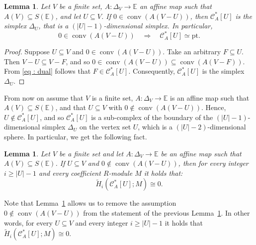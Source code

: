 \documentclass[a4paper,11pt,reqno, english]{amsart}
\newtheorem{lemma}[theorem]{Lemma}
\theoremstyle{definition}
\theoremstyle{remark}
\newcommand\CC{\mathscr C}
\newcommand\E{\mathbb{E}}
\newcommand\pt{\mathrm{pt}}
\DeclareMathOperator{\conv}{\mathrm{conv}}
\begin{document}
\medskip
\begin{lemma}
	\label{lem : topology of induced sub-complexes 01 }
	Let $V$ be a finite set, $A\colon \Delta_V\longrightarrow\E$ an affine map such that $A(V)\subseteq S(\E)$, and let $U\subseteq V$.
	If $0\in\conv( A(V-U))$, then $\CC_A^*[U]$ is the simplex $\Delta_U$, that is a $(|U|-1)$-dimensional simplex.
	In particular,
	\[
		0\in\conv( A(V-U)) \quad \Longrightarrow \quad\CC_A^*[U]\simeq\pt.
	\]
\end{lemma}
\begin{proof}
	Suppose $U\subseteq V$ and $0\in \conv(A(V-U))$.
	Take an arbitrary $F\subseteq U$.
	Then $V-U\subseteq V-F$, and so $0\in \conv (A(V-U))\subseteq\conv (A (V-F))$.
	From \eqref{eq : dual} follows that $F\in\CC_A^*[U]$.
	Consequently, $\CC_A^*[U]$ is the simplex $\Delta_U$.
\end{proof}



\medskip
From now on assume that $V$ is a finite set, $A\colon \Delta_V\longrightarrow\E$ is an affine map such that $A(V)\subseteq S(\E)$, and that $U\subseteq V$ with  $0\notin\conv (A(V-U))$.
Hence, $U\notin\CC_A^*[U]$, and so $\CC_A^*[U]$ is a sub-complex of the boundary of the $(|U|-1)$-dimensional simplex $\Delta_U$ on the vertex set $U$, which is a $(|U|-2)$-dimensional sphere.
In particular, we get the following fact.


\medskip
\begin{lemma}
	\label{lem : topology of induced sub-complexes 02 }
	Let $V$ be a finite set and let $A\colon \Delta_V\longrightarrow\E$ be an affine map such that $A(V)\subseteq S(\E)$.
	If $U\subseteq V$ and $0\notin\conv (A(V-U))$, then for every integer $i\geq |U|-1$ and every coefficient $R$-module $M$ it holds that:
	\[
		\widetilde{H}_i(\CC_A^*[U];M)\cong 0.
	\]
\end{lemma}

\medskip
Note that Lemma~\ref{lem : topology of induced sub-complexes 01 } allows us to remove the assumption $0\notin\conv (A(V-U))$ from the statement of the previous Lemma~\ref{lem : topology of induced sub-complexes 02 }.
In other words, for every $U\subseteq V$ and every integer $i\geq |U| - 1$ it holds that $ \widetilde{H}_i(\CC_A^*[U];M)\cong 0$.
\end{document}
